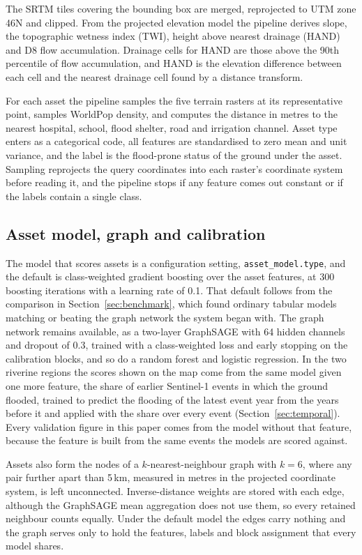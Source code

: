 \documentclass[11pt]{article}
\begin{document}
The SRTM tiles covering the bounding box are merged, reprojected to UTM zone 46N and clipped. From the projected elevation model the pipeline derives slope, the topographic wetness index (TWI), height above nearest drainage (HAND) and D8 flow accumulation. Drainage cells for HAND are those above the 90th percentile of flow accumulation, and HAND is the elevation difference between each cell and the nearest drainage cell found by a distance transform.

For each asset the pipeline samples the five terrain rasters at its representative point, samples WorldPop density, and computes the distance in metres to the nearest hospital, school, flood shelter, road and irrigation channel. Asset type enters as a categorical code, all features are standardised to zero mean and unit variance, and the label is the flood-prone status of the ground under the asset. Sampling reprojects the query coordinates into each raster's coordinate system before reading it, and the pipeline stops if any feature comes out constant or if the labels contain a single class.

\subsection*{Asset model, graph and calibration}

The model that scores assets is a configuration setting, \texttt{asset\_model.type}, and the default is class-weighted gradient boosting over the asset features, at 300 boosting iterations with a learning rate of 0.1. That default follows from the comparison in Section~\ref{sec:benchmark}, which found ordinary tabular models matching or beating the graph network the system began with. The graph network remains available, as a two-layer GraphSAGE with 64 hidden channels and dropout of 0.3, trained with a class-weighted loss and early stopping on the calibration blocks, and so do a random forest and logistic regression. In the two riverine regions the scores shown on the map come from the same model given one more feature, the share of earlier Sentinel-1 events in which the ground flooded, trained to predict the flooding of the latest event year from the years before it and applied with the share over every event (Section~\ref{sec:temporal}). Every validation figure in this paper comes from the model without that feature, because the feature is built from the same events the models are scored against.

Assets also form the nodes of a $k$-nearest-neighbour graph with $k=6$, where any pair further apart than 5\,km, measured in metres in the projected coordinate system, is left unconnected. Inverse-distance weights are stored with each edge, although the GraphSAGE mean aggregation does not use them, so every retained neighbour counts equally. Under the default model the edges carry nothing and the graph serves only to hold the features, labels and block assignment that every model shares.
\end{document}
